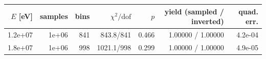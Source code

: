 \begin{tabular}{rrrrrrr}
\toprule
$E$ [eV] & samples & bins & $\chi^2/\mathrm{dof}$ & $p$ & yield (sampled / inverted) & quad. err. \\
\midrule
1.2e+07 & 1e+06 & 841 & 843.8/841 & 0.466 & 1.00000 / 1.00000 & 4.2e-04 \\
1.8e+07 & 1e+06 & 998 & 1021.1/998 & 0.299 & 1.00000 / 1.00000 & 4.9e-05 \\
\bottomrule
\end{tabular}
